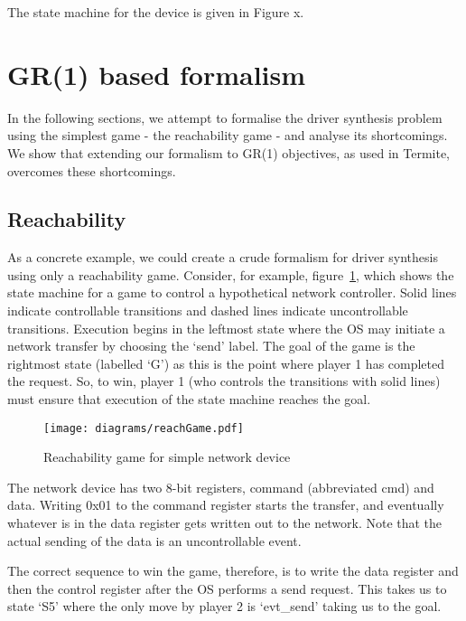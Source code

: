 The state machine for the device is given in Figure x. 

\section{GR(1) based formalism}

In the following sections, we attempt to formalise the driver synthesis problem using the simplest game - the reachability game - and analyse its shortcomings. We show that extending our formalism to GR(1) objectives, as used in Termite, overcomes these shortcomings.

\subsection{Reachability}

As a concrete example, we could create a crude formalism for driver synthesis using only a reachability game. Consider, for example, figure~\ref{fig:reach}, which shows the state machine for a game to control a hypothetical network controller. Solid lines indicate controllable transitions and dashed lines indicate uncontrollable transitions. Execution begins in the leftmost state where the OS may initiate a network transfer by choosing the `send' label. The goal of the game is the rightmost state (labelled `G') as this is the point where player 1 has completed the request. So, to win, player 1 (who controls the transitions with solid lines) must ensure that execution of the state machine reaches the goal. 

\begin{figure}
\centering
\texttt{[image: diagrams/reachGame.pdf]}
\caption{Reachability game for simple network device}
\label{fig:reach}
\end{figure}

The network device has two 8-bit registers, command (abbreviated cmd) and data. Writing 0x01 to the command register starts the transfer, and eventually whatever is in the data register gets written out to the network. Note that the actual sending of the data is an uncontrollable event. 

The correct sequence to win the game, therefore, is to write the data register and then the control register after the OS performs a send request. This takes us to state `S5' where the only move by player 2 is `evt\_send' taking us to the goal. 

